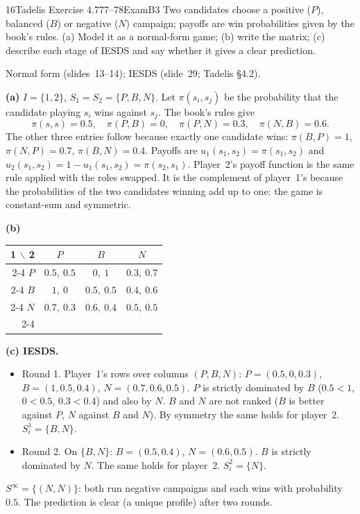 \begin{exsol}{16}{Tadelis Exercise 4.7}{77--78}{Exam}{B3}
\asked Two candidates choose a positive ($P$), balanced ($B$) or negative ($N$) campaign; payoffs
are win probabilities given by the book's rules. (a) Model it as a normal-form game; (b) write
the matrix; (c) describe each stage of IESDS and say whether it gives a clear prediction.

\method Normal form (slides~13--14); IESDS (slide~29; Tadelis \S4.2).

\solution
\textbf{(a)} $I = \{1, 2\}$, $S_1 = S_2 = \{P, B, N\}$. Let $\pi(s_i, s_j)$ be the probability that
the candidate playing $s_i$ wins against $s_j$. The book's rules give
\[
  \pi(s,s) = 0.5,\quad \pi(P,B) = 0,\quad \pi(P,N) = 0.3,\quad \pi(N,B) = 0.6 .
\]
The other three entries follow because exactly one candidate wins:
$\pi(B,P) = 1$, $\pi(N,P) = 0.7$, $\pi(B,N) = 0.4$. Payoffs are $u_1(s_1,s_2) = \pi(s_1,s_2)$ and
$u_2(s_1,s_2) = 1 - u_1(s_1,s_2) = \pi(s_2,s_1)$. Player~2's payoff function is the same rule
applied with the roles swapped. It is the complement of player~1's because the probabilities of
the two candidates winning add up to one: the game is constant-sum and symmetric.

\textbf{(b)}
\begin{center}
\begin{tabular}{r|c|c|c|}
\multicolumn{1}{r}{1 $\backslash$ 2} & \multicolumn{1}{c}{$P$} & \multicolumn{1}{c}{$B$} & \multicolumn{1}{c}{$N$}\\ \cline{2-4}
$P$ & $0.5,\ 0.5$ & $0,\ 1$ & $0.3,\ 0.7$ \\ \cline{2-4}
$B$ & $1,\ 0$ & $0.5,\ 0.5$ & $0.4,\ 0.6$ \\ \cline{2-4}
$N$ & $0.7,\ 0.3$ & $0.6,\ 0.4$ & $0.5,\ 0.5$ \\ \cline{2-4}
\end{tabular}
\end{center}

\textbf{(c) IESDS.}
\begin{itemize}
  \item Round 1. Player~1's rows over columns $(P, B, N)$: $P = (0.5, 0, 0.3)$,
  $B = (1, 0.5, 0.4)$, $N = (0.7, 0.6, 0.5)$. $P$ is strictly dominated by $B$
  ($0.5 < 1$, $0 < 0.5$, $0.3 < 0.4$) and also by $N$. $B$ and $N$ are not ranked ($B$ is better
  against $P$, $N$ against $B$ and $N$). By symmetry the same holds for player~2.
  $S_i^1 = \{B, N\}$.
  \item Round 2. On $\{B, N\}$: $B = (0.5, 0.4)$, $N = (0.6, 0.5)$. $B$ is strictly dominated
  by $N$. The same holds for player~2. $S_i^2 = \{N\}$.
\end{itemize}
$S^\infty = \{(N, N)\}$: both run negative campaigns and each wins with probability $0.5$. The
prediction is clear (a unique profile) after two rounds.


\end{exsol}
